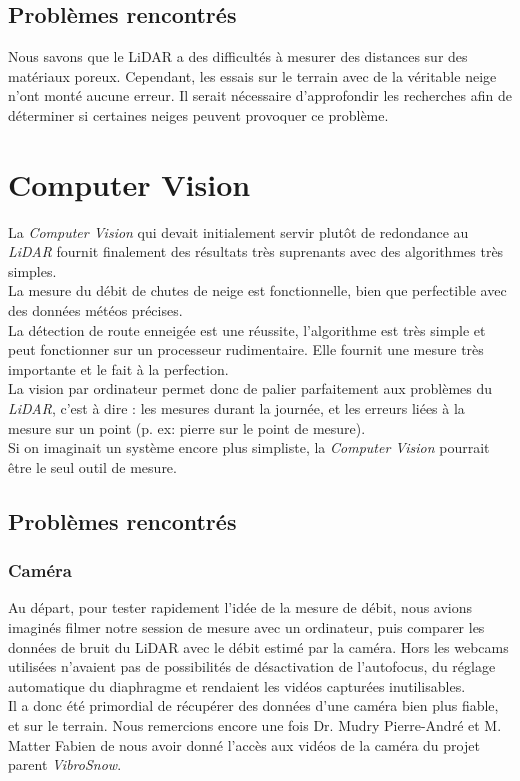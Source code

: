 \subsection{Problèmes rencontrés}
Nous savons que le LiDAR a des difficultés à mesurer des distances sur des matériaux poreux. Cependant,
les essais sur le terrain avec de la véritable neige n'ont monté aucune erreur. Il serait nécessaire
d'approfondir les recherches afin de déterminer si certaines neiges peuvent provoquer ce problème.

\section{Computer Vision}
La \emph{Computer Vision} qui devait initialement servir plutôt de redondance au \emph{LiDAR} fournit
finalement des résultats très suprenants avec des algorithmes très simples.\\
La mesure du débit de chutes de neige est fonctionnelle, bien que perfectible avec des données météos précises.\\
La détection de route enneigée est une réussite, l'algorithme est très simple et peut fonctionner sur un
processeur rudimentaire. Elle fournit une mesure très importante et le fait à la perfection.\\
La vision par ordinateur permet donc de palier parfaitement aux problèmes du \emph{LiDAR},
c'est à dire : les mesures durant la journée, et les erreurs liées à la mesure sur un point (p. ex: pierre sur le point de mesure).\\
Si on imaginait un système encore plus simpliste, la \emph{Computer Vision} pourrait être le seul outil de mesure.

\subsection{Problèmes rencontrés}
\subsubsection{Caméra}
Au départ, pour tester rapidement l'idée de la mesure de débit, nous avions imaginés filmer notre session
de mesure avec un ordinateur, puis comparer les données de bruit du LiDAR avec le débit estimé par
la caméra. Hors les webcams utilisées n'avaient pas de possibilités de désactivation de l'autofocus,
du réglage automatique du diaphragme et rendaient les vidéos capturées inutilisables.\\
Il a donc été primordial de récupérer des données d'une caméra bien plus fiable, et sur le terrain.
Nous remercions encore une fois Dr. Mudry Pierre-André et M. Matter Fabien de nous avoir donné
l'accès aux vidéos de la caméra du projet parent \emph{VibroSnow\cite{VibroSnow}}.
